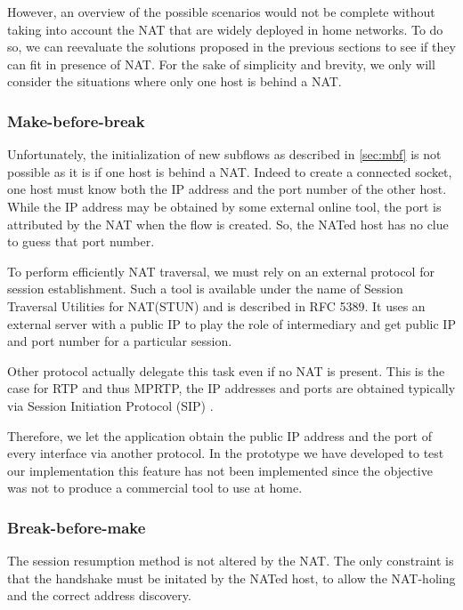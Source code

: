 However, an overview of the possible scenarios would not be complete without taking into account the NAT that are widely deployed in home networks. To do so, we can reevaluate the solutions proposed in the previous sections to see if they can fit in presence of NAT. For the sake of simplicity and brevity, we only will consider the situations where only one host is behind a NAT.



\subsubsection{Make-before-break}

Unfortunately, the initialization of new subflows as described in \ref{sec:mbf} is not possible as it is if one host is behind a NAT. Indeed to create a connected socket, one host must know both the IP address and the port number of the other host. While the IP address may be obtained by some external online tool, the port is attributed by the NAT when the flow is created. So, the NATed host has no clue to guess that port number.

To perform efficiently NAT traversal, we must rely on an external protocol for session establishment. Such a tool is available under the name of Session Traversal Utilities for NAT(STUN) and is described in RFC 5389\cite{RFC5389}. It uses an external server with a public IP to play the role of intermediary and get public IP and port number for a particular session.

Other protocol actually delegate this task even if no NAT is present. This is the case for RTP and thus MPRTP, the IP addresses and ports are obtained typically via Session Initiation Protocol (SIP) \cite{RFC3261}.

Therefore, we let the application obtain the public IP address and the port of every interface via another protocol. In the prototype we have developed to test our implementation this feature has not been implemented since the objective was not to produce a commercial tool to use at home.


\subsubsection{Break-before-make}
The session resumption method is not altered by the NAT. The only constraint is that the handshake must be initated by the NATed host, to allow the NAT-holing and the correct address discovery.


